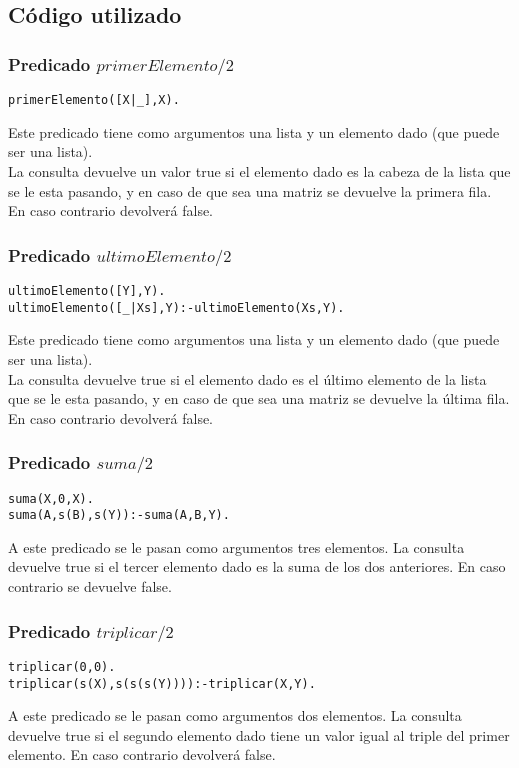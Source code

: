 \documentclass[11pt, a4paper]{article}
\begin{document}
\subsection{Código utilizado}
\subsubsection{Predicado $primerElemento/2$}
\begin{lstlisting}[frame=single]
primerElemento([X|_],X).
\end{lstlisting}
Este predicado tiene como argumentos una lista y un elemento dado (que puede ser una lista).\\
La consulta devuelve un valor true si el elemento dado es la cabeza de la lista que se le esta pasando, y en caso de que sea una matriz se devuelve la primera fila. En caso contrario devolverá false.
\subsubsection{Predicado $ultimoElemento/2$}
\begin{lstlisting}[frame=single]
ultimoElemento([Y],Y).
ultimoElemento([_|Xs],Y):-ultimoElemento(Xs,Y).
\end{lstlisting}
Este predicado tiene como argumentos una lista y un elemento dado (que puede ser una lista). \\
La consulta devuelve true si el elemento dado es el último elemento de la lista que se le esta pasando, y en caso de que sea una matriz se devuelve la última fila. En caso contrario devolverá false.
\subsubsection{Predicado $suma/2$}
\begin{lstlisting}[frame=single]
suma(X,0,X).
suma(A,s(B),s(Y)):-suma(A,B,Y).
\end{lstlisting}
A este predicado se le pasan como argumentos tres elementos.
La consulta devuelve true si el tercer elemento dado es la suma de los dos anteriores. En caso contrario se devuelve false.
\subsubsection{Predicado $triplicar/2$}
\begin{lstlisting}[frame=single]
triplicar(0,0).
triplicar(s(X),s(s(s(Y)))):-triplicar(X,Y).
\end{lstlisting}
A este predicado se le pasan como argumentos dos elementos.
La consulta devuelve true si el segundo elemento dado tiene un valor igual al triple del primer elemento. En caso contrario devolverá false.
\end{document}
